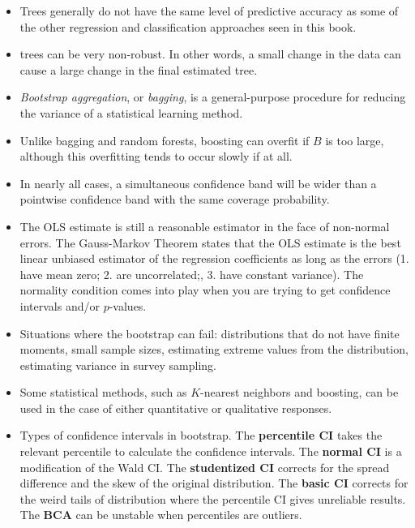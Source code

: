 \documentclass{article}
\begin{document}
\begin{itemize}
    \item Trees generally do not have the same level of predictive accuracy as some of the other regression and classification approaches seen in this book.
    \item trees can be very non-robust. In other words, a small change in the data can cause a large change in the final estimated tree.
    \item \textit{Bootstrap aggregation}, or \textit{bagging}, is a general-purpose procedure for reducing the variance of a statistical learning method.
    \item Unlike bagging and random forests, boosting can overfit if $B$ is too large, although this overfitting tends to occur slowly if at all.
\end{itemize}

\begin{itemize}
    \item In nearly all cases, a simultaneous confidence band will be wider than a pointwise confidence band with the same coverage probability.
    \item The OLS estimate is still a reasonable estimator in the face of non-normal errors. The Gauss-Markov Theorem states that the OLS estimate is the best linear unbiased estimator of the regression coefficients as long as the errors (1. have mean zero; 2. are uncorrelated;, 3. have constant variance). The normality condition comes into play when you are trying to get confidence intervals and/or $p$-values.
    \item Situations where the bootstrap can fail: distributions that do not have finite moments, small sample sizes, estimating extreme values from the distribution, estimating variance in survey sampling.
    \item Some statistical methods, such as $K$-nearest neighbors and boosting, can be used in the case of either quantitative or qualitative responses.
    \item Types of confidence intervals in bootstrap. The \textbf{percentile CI} takes the relevant percentile to calculate the confidence intervals. The \textbf{normal CI} is a modification of the Wald CI. The \textbf{studentized CI} corrects for the spread difference and the skew of the original distribution. The \textbf{basic CI} corrects for the weird tails of distribution where the percentile CI gives unreliable results. The \textbf{BCA} can be unstable when percentiles are outliers.
\end{itemize}
\end{document}
